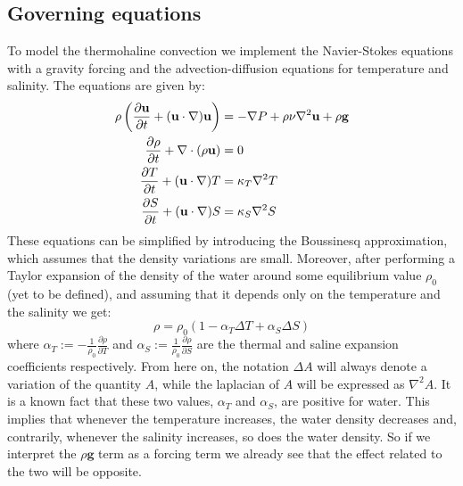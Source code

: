 \documentclass{article}
\begin{document}
\subsection{Governing equations}
To model the thermohaline convection we implement the Navier-Stokes equations with a gravity forcing and the advection-diffusion equations for temperature and salinity. The equations are given by:
\begin{equation}
  \begin{aligned}
    \rho\left(\frac{\partial\mathbf{u}}{\partial t} + (\mathbf{u}\cdot\nabla)\mathbf{u}\right) & = -\nabla P + \rho\nu\nabla^2\mathbf{u} + \rho \mathbf{g} \\
    \pdv{\rho}{t} + \nabla\cdot(\rho\mathbf{u})                                                & = 0                                                       \\
    \frac{\partial T}{\partial t} + (\mathbf{u}\cdot\nabla)T                                   & = \kappa_T \nabla^2T                                      \\
    \frac{\partial S}{\partial t} + (\mathbf{u}\cdot\nabla)S                                   & = \kappa_S \nabla^2S                                      \\
  \end{aligned}
\end{equation}
These equations can be simplified by introducing the Boussinesq approximation, which assumes that the density variations are small. Moreover, after performing a Taylor expansion of the density of the water around some equilibrium value $\rho_0$ (yet to be defined), and assuming that it depends only on the temperature and the salinity we get:
\begin{equation}
  \rho = \rho_0(1-\alpha_T\Delta T + \alpha_S\Delta S)
\end{equation}
where $\alpha_T:= -\frac{1}{\rho_0}\frac{\partial\rho}{\partial T}$ and $\alpha_S:= \frac{1}{\rho_0}\frac{\partial\rho}{\partial S}$ are the thermal and saline expansion coefficients respectively. From here on, the notation $\Delta A$ will always denote a variation of the quantity $A$, while the laplacian of $A$ will be expressed as $\nabla^2A$. It is a known fact that these two values, $\alpha_T$ and $\alpha_S$, are positive for water. This implies that whenever the temperature increases, the water density decreases and, contrarily, whenever the salinity increases, so does the water density. So if we interpret the $\rho\mathbf{g}$ term as a forcing term we already see that the effect related to the two will be opposite.
\end{document}
